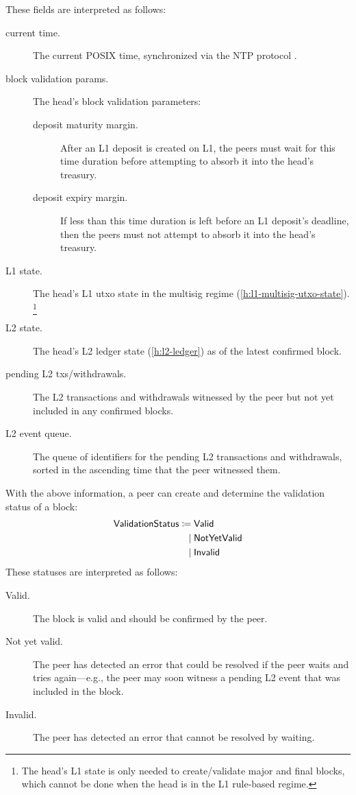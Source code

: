 \documentclass[../hydrozoa.tex]{subfiles}
\begin{document}
These fields are interpreted as follows:
\begin{description}
  \item[current time.] The current POSIX time, synchronized via the NTP protocol \citep{MillsEtAlNetworkTimeProtocol2010}.
  \item[block validation params.] The head's block validation parameters:
    \begin{description}
      \item[deposit maturity margin.] After an L1 deposit is created on L1, the peers must wait for this time duration before attempting to absorb it into the head's treasury.
      \item[deposit expiry margin.] If less than this time duration is left before an L1 deposit's deadline, then the peers must not attempt to absorb it into the head's treasury.
    \end{description}
  \item[L1 state.] The head's L1 utxo state in the multisig regime (\cref{h:l1-multisig-utxo-state}).%
    \footnote{The head's L1 state is only needed to create/validate major and final blocks, which cannot be done when the head is in the L1 rule-based regime.}
  \item[L2 state.] The head's L2 ledger state (\cref{h:l2-ledger}) as of the latest confirmed block.
  \item[pending L2 txs/withdrawals.] The L2 transactions and withdrawals witnessed by the peer but not yet included in any confirmed blocks.
  \item[L2 event queue.] The queue of identifiers for the pending L2 transactions and withdrawals, sorted in the ascending time that the peer witnessed them.
\end{description}

With the above information, a peer can create and determine the validation status of a block:
\begin{equation*}
\begin{split}
  \mathsf{ValidationStatus} \coloneq&\;
    \mathsf{Valid} \\\mid&\;
    \mathsf{NotYetValid} \\\mid&\;
    \mathsf{Invalid}
\end{split}
\end{equation*}
These statuses are interpreted as follows:
\begin{description}
  \item[Valid.] The block is valid and should be confirmed by the peer.
  \item[Not yet valid.] The peer has detected an error that could be resolved if the peer waits and tries again---e.g., the peer may soon witness a pending L2 event that was included in the block.
  \item[Invalid.] The peer has detected an error that cannot be resolved by waiting.
\end{description}
\end{document}
